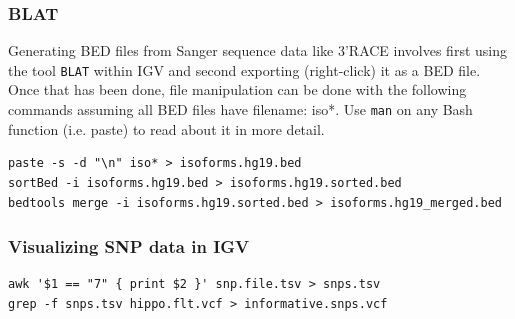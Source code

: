 \begin{enumerate}
\begin{enumerate}
  \end{enumerate}
  \begin{figure}[ht]
    \centering
  \end{figure}
\end{enumerate}

\subsubsection*{BLAT}
Generating BED files from Sanger sequence data like 3'RACE involves first using the tool \texttt{BLAT} within IGV and second exporting (right-click) it as a BED file. Once that has been done, file manipulation can be done with the following commands assuming all BED files have filename: iso*. Use \texttt{man} on any Bash function (i.e. paste) to read about it in more detail.

\begin{verbatim}
paste -s -d "\n" iso* > isoforms.hg19.bed
sortBed -i isoforms.hg19.bed > isoforms.hg19.sorted.bed
bedtools merge -i isoforms.hg19.sorted.bed > isoforms.hg19_merged.bed
\end{verbatim}

\subsubsection*{Visualizing SNP data in IGV}

\begin{verbatim}
awk '$1 == "7" { print $2 }' snp.file.tsv > snps.tsv
grep -f snps.tsv hippo.flt.vcf > informative.snps.vcf
\end{verbatim}

